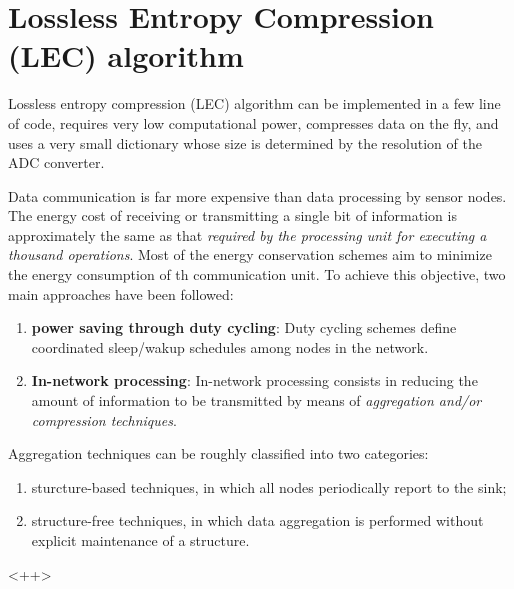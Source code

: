 \chapter{Lossless Entropy Compression (LEC) algorithm}

Lossless entropy compression (LEC) algorithm can be implemented in \textcolor[rgb]{1,0,0}{a few line of code}, requires \textcolor[rgb]{1,0,0}{very low computational power}, \textcolor[rgb]{1,0,0}{compresses data on the fly}, and \textcolor[rgb]{1,0,0}{uses a very small dictionary whose size is determined by the resolution of the ADC converter}. 

Data communication is far more expensive than data processing by sensor nodes. The energy cost of receiving or transmitting a single bit of information is approximately the same as that \emph{\textcolor[rgb]{1,0,0}{required by the processing unit for executing a thousand operations}}. Most of the energy conservation schemes aim to minimize the energy consumption of th communication unit. To achieve this objective, two main approaches have been followed:
\begin{enumerate}
    \item \textbf{\textcolor[rgb]{1,0,0}{power saving through duty cycling}}: Duty cycling schemes define coordinated sleep/wakup schedules among nodes in the network. \cite{Anastasi2009}
    \item \textbf{\textcolor[rgb]{1,0,0}{In-network processing}}: In-network processing consists in reducing the amount of information to be transmitted by means of \emph{\textcolor[rgb]{1,0,0}{aggregation and/or compression techniques}}. 
\end{enumerate}

Aggregation techniques can be roughly classified into two categories: 
\begin{enumerate}
    \item sturcture-based techniques, in which all nodes periodically report to the sink;
    \item structure-free techniques, in which data aggregation is performed without explicit maintenance of a structure.
\end{enumerate}<++>



